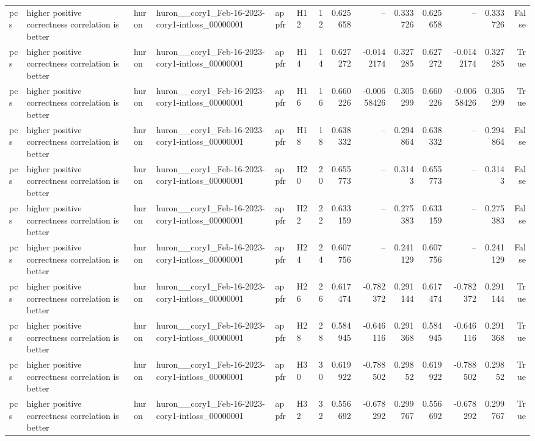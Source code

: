 \begin{longtable}{llllllrrrrrrrr}
pcs & higher positive correctness correlation is better & huron & huron\_\_cory1\_Feb-16-2023-cory1-intloss\_00000001 & appfr & H12 & 12 & 0.625658 & -- & 0.333726 & 0.625658 & -- & 0.333726 & False \\
pcs & higher positive correctness correlation is better & huron & huron\_\_cory1\_Feb-16-2023-cory1-intloss\_00000001 & appfr & H14 & 14 & 0.627272 & -0.0142174 & 0.327285 & 0.627272 & -0.0142174 & 0.327285 & True \\
pcs & higher positive correctness correlation is better & huron & huron\_\_cory1\_Feb-16-2023-cory1-intloss\_00000001 & appfr & H16 & 16 & 0.660226 & -0.00658426 & 0.305299 & 0.660226 & -0.00658426 & 0.305299 & True \\
pcs & higher positive correctness correlation is better & huron & huron\_\_cory1\_Feb-16-2023-cory1-intloss\_00000001 & appfr & H18 & 18 & 0.638332 & -- & 0.294864 & 0.638332 & -- & 0.294864 & False \\
pcs & higher positive correctness correlation is better & huron & huron\_\_cory1\_Feb-16-2023-cory1-intloss\_00000001 & appfr & H20 & 20 & 0.655773 & -- & 0.3143 & 0.655773 & -- & 0.3143 & False \\
pcs & higher positive correctness correlation is better & huron & huron\_\_cory1\_Feb-16-2023-cory1-intloss\_00000001 & appfr & H22 & 22 & 0.633159 & -- & 0.275383 & 0.633159 & -- & 0.275383 & False \\
pcs & higher positive correctness correlation is better & huron & huron\_\_cory1\_Feb-16-2023-cory1-intloss\_00000001 & appfr & H24 & 24 & 0.607756 & -- & 0.241129 & 0.607756 & -- & 0.241129 & False \\
pcs & higher positive correctness correlation is better & huron & huron\_\_cory1\_Feb-16-2023-cory1-intloss\_00000001 & appfr & H26 & 26 & 0.617474 & -0.782372 & 0.291144 & 0.617474 & -0.782372 & 0.291144 & True \\
pcs & higher positive correctness correlation is better & huron & huron\_\_cory1\_Feb-16-2023-cory1-intloss\_00000001 & appfr & H28 & 28 & 0.584945 & -0.646116 & 0.291368 & 0.584945 & -0.646116 & 0.291368 & True \\
pcs & higher positive correctness correlation is better & huron & huron\_\_cory1\_Feb-16-2023-cory1-intloss\_00000001 & appfr & H30 & 30 & 0.619922 & -0.788502 & 0.29852 & 0.619922 & -0.788502 & 0.29852 & True \\
pcs & higher positive correctness correlation is better & huron & huron\_\_cory1\_Feb-16-2023-cory1-intloss\_00000001 & appfr & H32 & 32 & 0.556692 & -0.678292 & 0.299767 & 0.556692 & -0.678292 & 0.299767 & True \\

\end{longtable}
